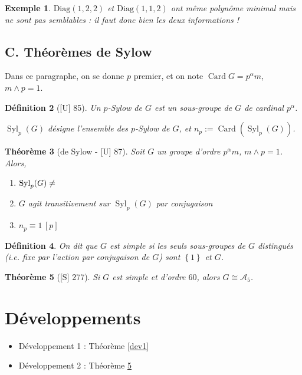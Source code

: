 \documentclass[10pt, a4paper, parskip=full, twoside, twocolumn]{report}
\newtheorem{definition}{Définition}
\newtheorem{theorem}[definition]{Théorème}
\newtheorem{example}[definition]{Exemple}
\DeclareMathOperator{\card}{Card}
\DeclareMathOperator{\Syl}{Syl}
\begin{document}
\begin{example}
	$\text{Diag}(1,2,2)$ et $\text{Diag}(1,1,2)$ ont même polynôme minimal mais ne sont pas semblables : il faut donc bien les deux informations !
\end{example}

\subsection*{C. Théorèmes de Sylow}
Dans ce paragraphe, on se donne $p$ premier, et on note $\card G = p^{\alpha}m$, $m\wedge p = 1$.

\begin{definition}[\textnormal{[U] 85}]
	Un $p$-Sylow de $G$ est un sous-groupe de $G$ de cardinal $p^{\alpha}$.

	$\Syl_p(G)$ désigne l'ensemble des $p$-Sylow de $G$, et $n_p := \card(\Syl_p(G))$.
\end{definition}

\begin{theorem}[de Sylow - \textnormal{[U] 87}]Soit $G$ un groupe d'ordre $p^{\alpha}m$, $m\wedge p = 1$. Alors,
	\begin{enumerate}
		\item $\Syl_p(G)\neq \empty$
		\item $G$ agit transitivement sur $\Syl_p(G)$ par conjugaison
		\item $n_p\equiv 1\, [p]$
	\end{enumerate}
\end{theorem}

\begin{definition}
	On dit que $G$ est \emph{simple} si les seuls sous-groupes de $G$ distingués (\emph{i.e.} fixe par l'action par conjugaison de $G$)
	sont $\left\{1\right\}$ et $G$.
\end{definition}

\begin{tcolorbox}[
    breakable, %
    colback=developpement, %
    colframe=gray!0!black, %
    boxrule=0pt, %
    arc=1mm, %
	boxsep=0pt,
	left=0pt, right=0pt, top=0pt, bottom=0pt
]
\begin{theorem}[\textnormal{[S] 277}]\label{dev2}
	Si $G$ est simple et d'ordre $60$, alors 
	$G\cong \mathcal{A}_5$.
\end{theorem}
\end{tcolorbox}

\section*{Développements}
\begin{itemize}
	\item Développement 1 : Théorème \ref{dev1}
	\item Développement 2 : Théorème \ref{dev2}
\end{itemize}
\end{document}
